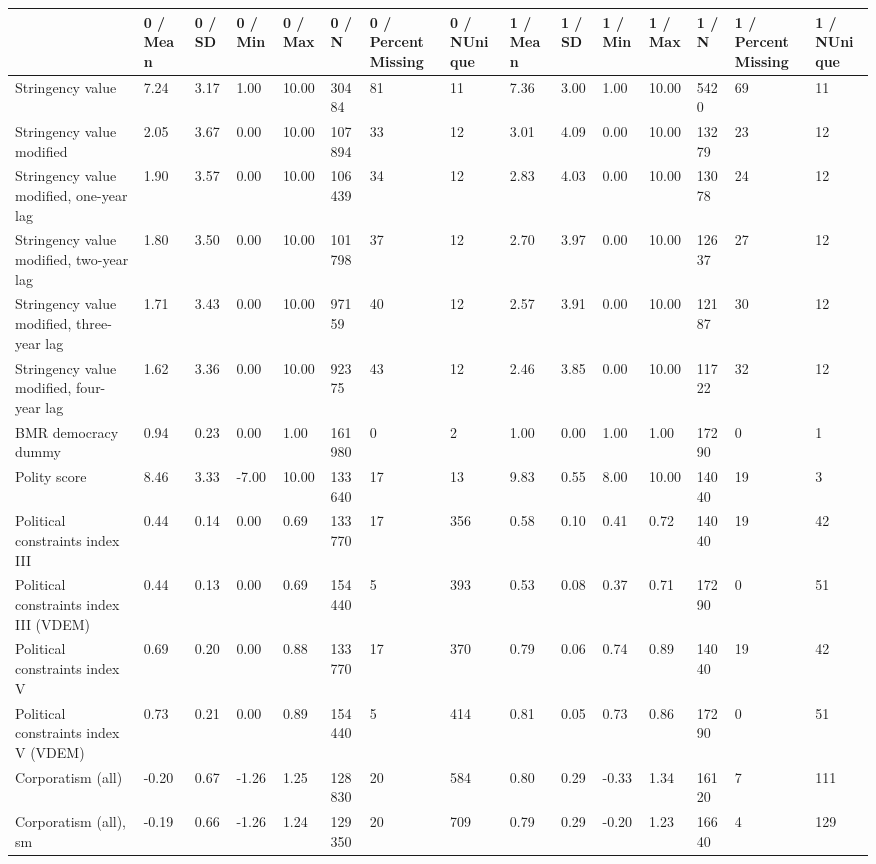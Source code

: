 
\begin{longtable}{lllllllllllllll}
\toprule
  & 0 / Mean & 0 / SD & 0 / Min & 0 / Max & 0 / N & 0 / PercentMissing & 0 / NUnique & 1 / Mean & 1 / SD & 1 / Min & 1 / Max & 1 / N & 1 / PercentMissing & 1 / NUnique\\
\midrule
Stringency value & 7.24 & 3.17 & 1.00 & 10.00 & 30484 & 81 & 11 & 7.36 & 3.00 & 1.00 & 10.00 & 5420 & 69 & 11\\
Stringency value modified & 2.05 & 3.67 & 0.00 & 10.00 & 107894 & 33 & 12 & 3.01 & 4.09 & 0.00 & 10.00 & 13279 & 23 & 12\\
Stringency value modified, one-year lag & 1.90 & 3.57 & 0.00 & 10.00 & 106439 & 34 & 12 & 2.83 & 4.03 & 0.00 & 10.00 & 13078 & 24 & 12\\
Stringency value modified, two-year lag & 1.80 & 3.50 & 0.00 & 10.00 & 101798 & 37 & 12 & 2.70 & 3.97 & 0.00 & 10.00 & 12637 & 27 & 12\\
Stringency value modified, three-year lag & 1.71 & 3.43 & 0.00 & 10.00 & 97159 & 40 & 12 & 2.57 & 3.91 & 0.00 & 10.00 & 12187 & 30 & 12\\
\addlinespace
Stringency value modified, four-year lag & 1.62 & 3.36 & 0.00 & 10.00 & 92375 & 43 & 12 & 2.46 & 3.85 & 0.00 & 10.00 & 11722 & 32 & 12\\
BMR democracy dummy & 0.94 & 0.23 & 0.00 & 1.00 & 161980 & 0 & 2 & 1.00 & 0.00 & 1.00 & 1.00 & 17290 & 0 & 1\\
Polity score & 8.46 & 3.33 & -7.00 & 10.00 & 133640 & 17 & 13 & 9.83 & 0.55 & 8.00 & 10.00 & 14040 & 19 & 3\\
Political constraints index III & 0.44 & 0.14 & 0.00 & 0.69 & 133770 & 17 & 356 & 0.58 & 0.10 & 0.41 & 0.72 & 14040 & 19 & 42\\
Political constraints index III (VDEM) & 0.44 & 0.13 & 0.00 & 0.69 & 154440 & 5 & 393 & 0.53 & 0.08 & 0.37 & 0.71 & 17290 & 0 & 51\\
\addlinespace
Political constraints index V & 0.69 & 0.20 & 0.00 & 0.88 & 133770 & 17 & 370 & 0.79 & 0.06 & 0.74 & 0.89 & 14040 & 19 & 42\\
Political constraints index V (VDEM) & 0.73 & 0.21 & 0.00 & 0.89 & 154440 & 5 & 414 & 0.81 & 0.05 & 0.73 & 0.86 & 17290 & 0 & 51\\
Corporatism (all) & -0.20 & 0.67 & -1.26 & 1.25 & 128830 & 20 & 584 & 0.80 & 0.29 & -0.33 & 1.34 & 16120 & 7 & 111\\
Corporatism (all), sm & -0.19 & 0.66 & -1.26 & 1.24 & 129350 & 20 & 709 & 0.79 & 0.29 & -0.20 & 1.23 & 16640 & 4 & 129\\

\end{longtable}
